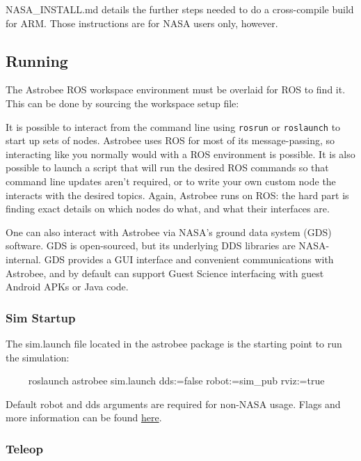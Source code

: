 \documentclass{article}
\begin{document}
NASA\_INSTALL.md details the further steps needed to do a cross-compile build for ARM. Those instructions are for NASA users only, however.

\subsection{Running}
The Astrobee ROS workspace environment must be overlaid for ROS to find it. This can be done by sourcing the workspace setup file:

It is possible to interact from the command line using \texttt{rosrun} or \texttt{roslaunch} to start up sets of nodes. Astrobee uses ROS for most of its message-passing, so interacting like you normally would with a ROS environment is possible. It is also possible to launch a script that will run the desired ROS commands so that command line updates aren't required, or to write your own custom node the interacts with the desired topics. Again, Astrobee runs on ROS: the hard part is finding exact details on which nodes do what, and what their interfaces are.

One can also interact with Astrobee via NASA's ground data system (GDS) software. GDS is open-sourced, but its underlying DDS libraries are NASA-internal. GDS provides a GUI interface and convenient communications with Astrobee, and by default can support Guest Science interfacing with guest Android APKs or Java code.

\subsubsection{Sim Startup}

The sim.launch file located in the astrobee package is the starting point to run the simulation:

\begin{markdown}
~~~~
roslaunch astrobee sim.launch dds:=false robot:=sim_pub rviz:=true
~~~~
\end{markdown}

Default robot and dds arguments are required for non-NASA usage. Flags and more information can be found \href{https://github.com/nasa/astrobee/blob/master/simulation/sim_overview.md}{here}.

\subsubsection{Teleop}
\end{document}
